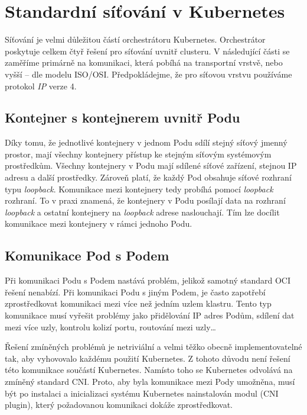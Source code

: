 \section{Standardní síťování v Kubernetes}
Síťování je velmi důležitou částí orchestrátoru Kubernetes. Orchestrátor poskytuje celkem čtyř řešení pro síťování uvnitř clusteru. V následující části se zaměříme primárně na komunikaci, která pobíhá na transportní vrstvě, nebo vyšší -- dle modelu ISO/OSI. Předpokládejme, že pro síťovou vrstvu používáme protokol \textit{IP} verze 4.

\subsection{Kontejner s kontejnerem uvnitř Podu}
Díky tomu, že jednotlivé kontejnery v jednom Podu sdílí stejný síťový jmenný prostor, mají všechny kontejnery přístup ke stejným síťovým systémovým prostředkům. Všechny kontejnery v Podu mají sdílené síťové zařízení, stejnou IP adresu a další prostředky. Zároveň platí, že každý Pod obsahuje síťové rozhraní typu \textit{loopback}. Komunikace mezi kontejnery tedy probíhá pomocí \textit{loopback} rozhraní. To v praxi znamená, že kontejnery v Podu posílají data na rozhraní \textit{loopback} a ostatní kontejnery na \textit{loopback} adrese naslouchají. Tím lze docílit komunikace mezi kontejnery v rámci jednoho Podu.%

\subsection{Komunikace Pod s Podem}
Při komunikaci Podu s Podem nastává problém, jelikož samotný standard OCI řešení nenabízí. Při komunikaci Podu s jiným Podem, je často zapotřebí zprostředkovat komunikaci mezi více než jedním uzlem klastru.
Tento typ komunikace musí vyřešit problémy jako přidělování IP adres Podům, sdílení dat mezi více uzly, kontrolu kolizí portu, routování mezi uzly\ldots

Řešení zmíněných problémů je netriviální a velmi těžko obecně implementovatelné tak, aby vyhovovalo každému použití Kubernetes. Z tohoto důvodu není řešení této komunikace součástí Kubernetes. Namísto toho se Kubernetes odvolává na zmíněný standard CNI. Proto, aby byla komunikace mezi Pody umožněna, musí být po instalaci a inicializaci systému Kubernetes nainstalován modul (CNI plugin), který požadovanou komunikaci dokáže zprostředkovat.

